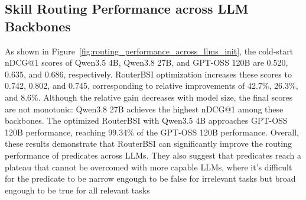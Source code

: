 \subsection{Skill Routing Performance across LLM Backbones}

As shown in Figure~\ref{fig:routing_performance_across_llms_init}, the cold-start nDCG@1 scores of Qwen3.5 4B, Qwen3.8 27B, and GPT-OSS 120B are 0.520, 0.635, and 0.686, respectively. RouterBSI optimization increases these scores to 0.742, 0.802, and 0.745, corresponding to relative improvements of 42.7\%, 26.3\%, and 8.6\%. Although the relative gain decreases with model size, the final scores are not monotonic: Qwen3.8 27B achieves the highest nDCG@1 among these backbones. The optimized RouterBSI with Qwen3.5 4B approaches GPT-OSS 120B performance, reaching 99.34\% of the GPT-OSS 120B performance. Overall, these results demonstrate that RouterBSI can significantly improve the routing performance of predicates across LLMs. They also suggest that predicates reach a plateau that cannot be overcomed with more capable LLMs, where it's difficult for the predicate to be narrow engough to be false for irrelevant tasks but broad engough to be true for all relevant tasks



\afterpage{%
\begingroup
\let\backbonepagefigure\figure
\renewcommand{\figure}[1][]{\backbonepagefigure[!ht]}

\endgroup
}

